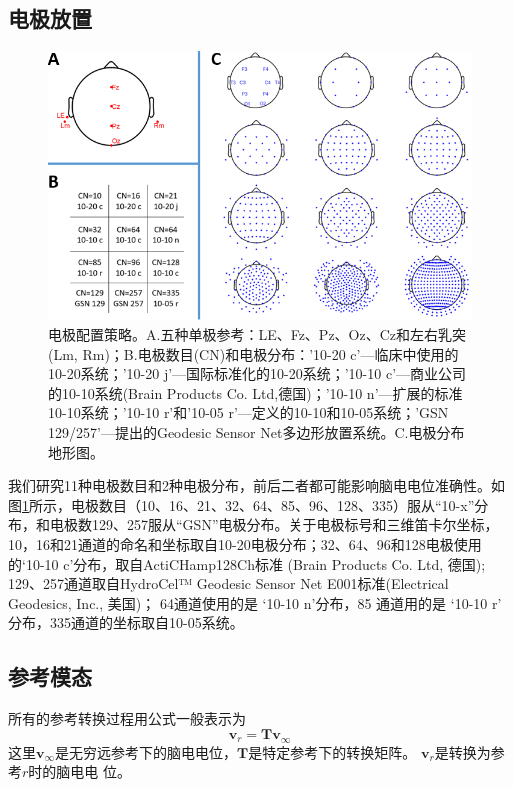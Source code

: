 \subsection{电极放置}
\begin{figure}[!ht]
	\centering
	\includegraphics[width=15cm]{pic/JNE/figure2.png}
	\caption{电极配置策略。A.五种单极参考：LE、Fz、Pz、Oz、Cz和左右乳突(Lm, Rm)；B.电极数目(CN)和电极分布：'10-20 c'—临床中使用的10-20系统；'10-20 j'—国际标准化的10-20系统；'10-10 c'—商业公司的10-10系统(Brain Products Co. Ltd,德国)；'10-10 n'—\cite{nuwer_m_r_ifcn_1998}扩展的标准10-10系统；'10-10 r'和'10-05 r'—\cite{oostenveld_r_and_praamstra_p_five_2001}定义的10-10和10-05系统；'GSN 129/257'—\cite{tucker_d_m_spatial_1993}提出的Geodesic Sensor Net多边形放置系统。C.电极分布地形图。}
	\label{2:layout}
\end{figure}
我们研究11种电极数目和2种电极分布，前后二者都可能影响脑电电位准确性。如图\ref{2:layout}所示，电极数目（10、16、21、32、64、85、96、128、335）服从“10-x”分布，和电极数129、257服从“GSN”电极分布。关于电极标号和三维笛卡尔坐标，10，16和21通道的命名和坐标取自10-20电极分布；32、64、96和128电极使用的‘10-10 c’分布，取自ActiCHamp128Ch标准 (Brain Products Co. Ltd, 德国); 129、257通道取自HydroCel™ Geodesic Sensor Net E001标准(Electrical Geodesics, Inc., 美国)； 64通道使用的是 ‘10-10 n’分布，85
通道用的是 ‘10-10 r’ 分布，335通道的坐标取自10-05系统。
\subsection{参考模态}
所有的参考转换过程用公式一般表示为
\begin{equation}\label{eq2.3}
\mathbf{v}_r=\mathbf{Tv}_{\infty}
\end{equation}
这里$\mathbf{v}_{\infty}$是无穷远参考下的脑电电位，$\mathbf{T}$是特定参考下的转换矩阵。 $\mathbf{v}_r$是转换为参考$r$时的脑电电
位。
